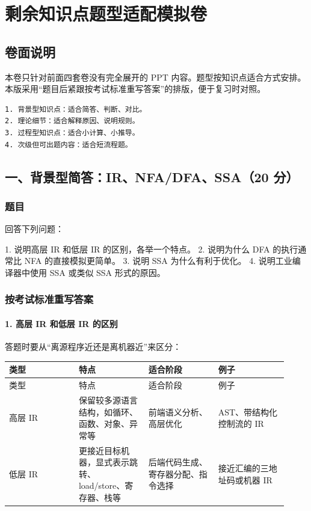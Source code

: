\documentclass[UTF8]{ctexart}
\begin{document}
\section*{剩余知识点题型适配模拟卷}

\subsection*{卷面说明}

本卷只针对前面四套卷没有完全展开的 PPT 内容。题型按知识点适合方式安排。本版采用“题目后紧跟按考试标准重写答案”的排版，便于复习时对照。

\begin{Verbatim}[fontsize=\small,breaklines=true]
1. 背景型知识点：适合简答、判断、对比。
2. 理论细节：适合解释原因、说明规则。
3. 过程型知识点：适合小计算、小推导。
4. 次级但可出题内容：适合短流程题。
\end{Verbatim}

\subsection*{一、背景型简答：IR、NFA/DFA、SSA（20 分）}

\subsubsection*{题目}

回答下列问题：

1. 说明高层 IR 和低层 IR 的区别，各举一个特点。 2. 说明为什么 DFA 的执行通常比 NFA 的直接模拟更简单。 3. 说明 SSA 为什么有利于优化。 4. 说明工业编译器中使用 SSA 或类似 SSA 形式的原因。

\subsubsection*{按考试标准重写答案}

\paragraph*{1. 高层 IR 和低层 IR 的区别}

答题时要从“离源程序近还是离机器近”来区分：

\begin{longtable}{|p{0.23\linewidth}|p{0.23\linewidth}|p{0.23\linewidth}|p{0.23\linewidth}|}
\hline
类型 & 特点 & 适合阶段 & 例子 \\
\hline
\endfirsthead
类型 & 特点 & 适合阶段 & 例子 \\
\hline
\endhead
高层 IR & 保留较多源语言结构，如循环、函数、对象、异常等 & 前端语义分析、高层优化 & AST、带结构化控制流的 IR \\
\hline
低层 IR & 更接近目标机器，显式表示跳转、load/store、寄存器、栈等 & 后端代码生成、寄存器分配、指令选择 & 接近汇编的三地址码或机器 IR \\
\hline
\end{longtable}
\end{document}
